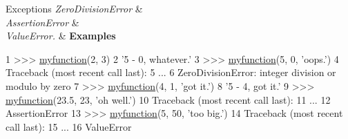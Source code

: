 \begin{DoxyExceptions}{Exceptions}
{\em Zero\-Division\-Error} & \\
\hline
{\em Assertion\-Error} & \\
\hline
{\em Value\-Error.} & {\bfseries Examples} 
\begin{DoxyCode}
1 >>> \hyperlink{namespace_parse_events_a4c8c7252291582e8a3a4e503a5fbfae8}{myfunction}(2, 3)
2 \textcolor{stringliteral}{'5 - 0, whatever.'}
3 >>> \hyperlink{namespace_parse_events_a4c8c7252291582e8a3a4e503a5fbfae8}{myfunction}(5, 0, \textcolor{stringliteral}{'oops.'})
4 Traceback (most recent call last):
5     ...
6 ZeroDivisionError: integer division \textcolor{keywordflow}{or} modulo by zero
7 >>> \hyperlink{namespace_parse_events_a4c8c7252291582e8a3a4e503a5fbfae8}{myfunction}(4, 1, \textcolor{stringliteral}{'got it.'})
8 \textcolor{stringliteral}{'5 - 4, got it.'}
9 >>> \hyperlink{namespace_parse_events_a4c8c7252291582e8a3a4e503a5fbfae8}{myfunction}(23.5, 23, \textcolor{stringliteral}{'oh well.'})
10 Traceback (most recent call last):
11     ...
12 AssertionError
13 >>> \hyperlink{namespace_parse_events_a4c8c7252291582e8a3a4e503a5fbfae8}{myfunction}(5, 50, \textcolor{stringliteral}{'too big.'})
14 Traceback (most recent call last):
15     ...
16 ValueError
\end{DoxyCode}
 \\
\hline
\end{DoxyExceptions}
